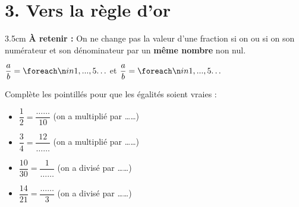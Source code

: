 \documentclass[a4paper]{book}
\begin{document}
    \section*{3. Vers la règle d'or}
    
    \begin{ZoneReponse}{3.5cm}
    \textbf{À retenir :} 
    On ne change pas la valeur d'une fraction si on \points[8] ou si on \points[8] son numérateur et son dénominateur par un \textbf{même nombre} non nul.
    \vspace{0.5cm}
    \begin{center}
        \Large $\dfrac{a}{b} = \points[5]$ \quad et \quad $\dfrac{a}{b} = \points[5]$
    \end{center}
    \end{ZoneReponse}

    \begin{exercice}
        Complète les pointillés pour que les égalités soient vraies :
        \vspace{0.4cm}
        
        \begin{minipage}{0.45\textwidth}
            \begin{itemize}
                \item $\dfrac{1}{2} = \dfrac{\dots\dots}{10}$ \normalsize (on a multiplié par \dots\dots)
                \vspace{0.3cm}
                \item $\dfrac{3}{4} = \dfrac{12}{\dots\dots}$ \normalsize (on a multiplié par \dots\dots)
            \end{itemize}
        \end{minipage}
        \hfill
        \begin{minipage}{0.45\textwidth}
            \begin{itemize}
                \item $\dfrac{10}{30} = \dfrac{1}{\dots\dots}$ \normalsize (on a divisé par \dots\dots)
                \vspace{0.3cm}
                \item $\dfrac{14}{21} = \dfrac{\dots\dots}{3}$ \normalsize (on a divisé par \dots\dots)
            \end{itemize}
        \end{minipage}
    \end{exercice}
    
\end{document}
